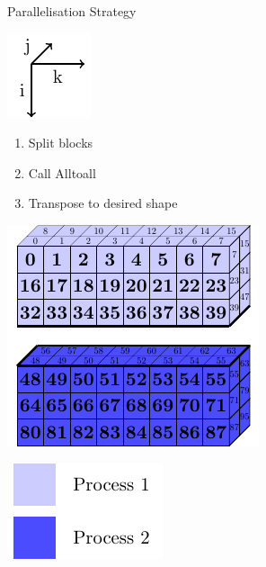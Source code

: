 \documentclass{beamer}
\begin{document}
\begin{frame}{Parallelisation Strategy}
 \begin{minipage}{.3\textwidth}
 \includegraphics[width=.4\textwidth]{SplitConcat3D/Axes}
 \vspace{4em}
 
  \begin{enumerate}
   \item Split blocks 
   \item Call Alltoall
   \item Transpose to desired shape
  \end{enumerate}
  
  \vspace{4em}
 \end{minipage}
 \begin{minipage}{.65\textwidth}
  \hspace{1pt}\includegraphics[width=.99\textwidth]{SplitConcat3D/Layout1Distrib1_2}
  
  \vspace{1em}
  
  \hfill\includegraphics[width=.3\textwidth]{SplitConcat3D/Legend}
 \end{minipage}
\end{frame}
\end{document}
